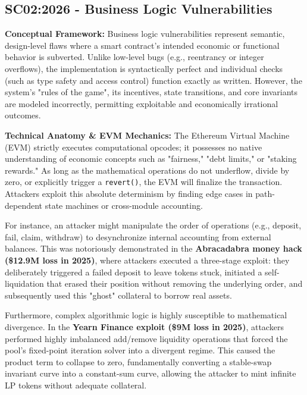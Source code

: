 \subsection{SC02:2026 - Business Logic Vulnerabilities}
\textbf{Conceptual Framework:} Business logic vulnerabilities represent semantic, design-level flaws where a smart contract’s intended economic or functional behavior is subverted. Unlike low-level bugs (e.g., reentrancy or integer overflows), the implementation is syntactically perfect and individual checks (such as type safety and access control) function exactly as written. However, the system's "rules of the game", its incentives, state transitions, and core invariants are modeled incorrectly, permitting exploitable and economically irrational outcomes.

\textbf{Technical Anatomy \& EVM Mechanics:} The Ethereum Virtual Machine (EVM) strictly executes computational opcodes; it possesses no native understanding of economic concepts such as "fairness," "debt limits," or "staking rewards." As long as the mathematical operations do not underflow, divide by zero, or explicitly trigger a \texttt{revert()}, the EVM will finalize the transaction. Attackers exploit this absolute determinism by finding edge cases in path-dependent state machines or cross-module accounting. 

For instance, an attacker might manipulate the order of operations (e.g., deposit, fail, claim, withdraw) to desynchronize internal accounting from external balances. This was notoriously demonstrated in the \textbf{Abracadabra money hack (\$12.9M loss in 2025)}, where attackers executed a three-stage exploit: they deliberately triggered a failed deposit to leave tokens stuck, initiated a self-liquidation that erased their position without removing the underlying order, and subsequently used this "ghost" collateral to borrow real assets. 

Furthermore, complex algorithmic logic is highly susceptible to mathematical divergence. In the \textbf{Yearn Finance exploit (\$9M loss in 2025)}, attackers performed highly imbalanced add/remove liquidity operations that forced the pool's fixed-point iteration solver into a divergent regime. This caused the product term to collapse to zero, fundamentally converting a stable-swap invariant curve into a constant-sum curve, allowing the attacker to mint infinite LP tokens without adequate collateral.

